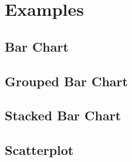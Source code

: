 \chapter{Examples}
\label{chap:Examples}

\section{Bar Chart}

\section{Grouped Bar Chart}

\section{Stacked Bar Chart}

\section{Scatterplot}

